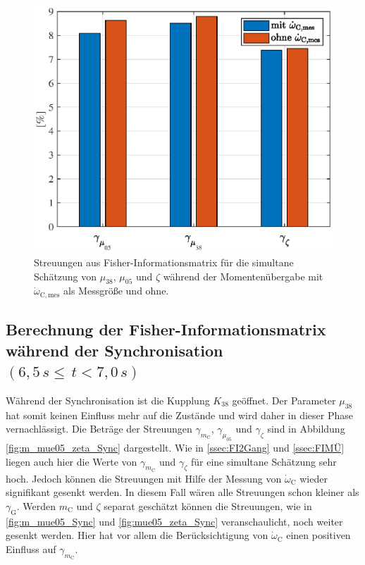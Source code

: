 \begin{figure}[ht]
  \centering
 \includegraphics[scale=0.9]{figures/03_Sensitivitaetsanalyse/03_Fisher_Info/Muebergabe/mu38_mue05_zeta.eps}
  \caption{Streuungen aus Fisher-Informationsmatrix für die simultane Schätzung von $\mu_{38}$, $\mu_{05}$ und $\zeta$ während der Momentenübergabe mit $\dot{\omega}_\mathrm{C,mes}$ als Messgröße und ohne.}\label{fig:MÜ_z_mu_sim}
\end{figure} 

\subsection{Berechnung der Fisher-Informationsmatrix während der Synchronisation $(6,5\, s\leq\, t<7,0\, s )$}
Während der Synchronisation ist die Kupplung $K_{38}$ geöffnet. Der Parameter $\mu_{38}$ hat somit keinen Einfluss mehr auf die Zustände und wird daher in dieser Phase vernachlässigt. Die Beträge der Streuungen $\gamma_{m_\mathrm{C}}$, $\gamma_{\mu_{05}}$ und $\gamma_{\zeta}$ sind in Abbildung \ref{fig:m_mue05_zeta_Sync} dargestellt. Wie in \ref{ssec:FI2Gang} und \ref{ssec:FIMÜ} liegen auch hier die Werte von $\gamma_{m_\mathrm{C}}$ und $\gamma_{\zeta}$ für eine simultane Schätzung sehr hoch. Jedoch können die Streuungen mit Hilfe der Messung von $\dot{\omega}_\mathrm{C}$ wieder signifikant  gesenkt werden. In diesem Fall wären alle Streuungen schon kleiner als $\gamma_\mathrm{G}$. Werden $m_\mathrm{C}$ und $\zeta$ separat geschätzt können die Streuungen, wie in \ref{fig:m_mue05_Sync} und \ref{fig:mue05_zeta_Sync} veranschaulicht, noch weiter gesenkt werden. Hier hat vor allem die Berücksichtigung von $\dot{\omega}_\mathrm{C}$ einen positiven Einfluss auf $\gamma_{m_\mathrm{C}}$.


